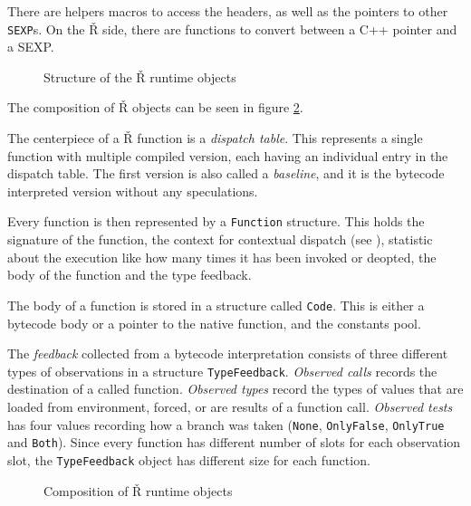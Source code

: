 There are helpers macros to access the headers, as well as the pointers to other \texttt{SEXP}s. On the Ř side, there are functions to convert between a C++ pointer and a SEXP.

\begin{figure}
	\centering
	\begin{adjustbox}{trim=10 80pt 0 0, clip}
	\end{adjustbox}
	\caption{Structure of the Ř runtime objects}\label{fig:rsh-object-struct}
\end{figure}

The composition of Ř objects can be seen in figure \ref{fig:rsh-composition}.

The centerpiece of a Ř function is a \textit{dispatch table}. This represents a single function with multiple compiled version, each having an individual entry in the dispatch table. The first version is also called a \textit{baseline}, and it is the bytecode interpreted version without any speculations.

Every function is then represented by a \texttt{Function} structure. This holds the signature of the function, the context for contextual dispatch (see ), statistic about the execution like how many times it has been invoked or deopted, the body of the function and the type feedback.

The body of a function is stored in a structure called \texttt{Code}. This is either a bytecode body or a pointer to the native function, and the constants pool.

The \textit{feedback} collected from a bytecode interpretation consists of three different types of observations in a structure \texttt{TypeFeedback}. \textit{Observed calls} records the destination of  a called function. \textit{Observed types} record the types of values that are loaded from environment, forced, or are results of a function call. \textit{Observed tests} has four values recording how a branch was taken (\texttt{None}, \texttt{OnlyFalse}, \texttt{OnlyTrue} and \texttt{Both}). Since every function has different number of slots for each observation slot, the \texttt{TypeFeedback} object has different size for each function. 

\begin{figure}
	\centering
	\caption{Composition of Ř runtime objects}\label{fig:rsh-composition}
\end{figure}


